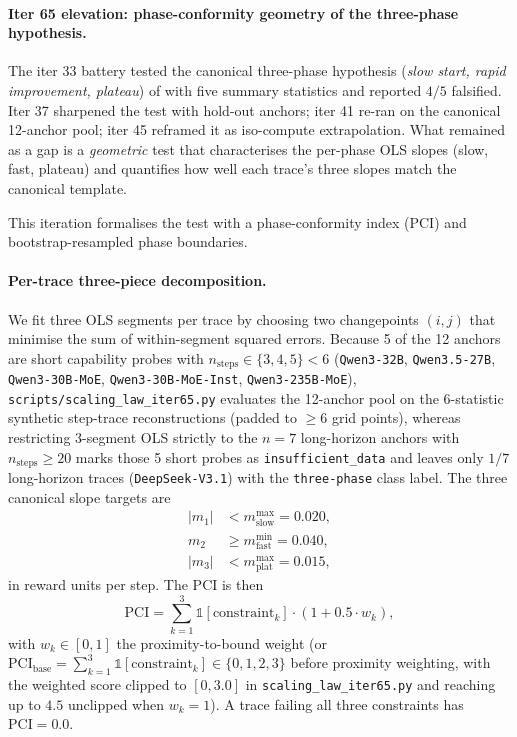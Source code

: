 \paragraph{Iter 65 elevation: phase-conformity geometry of the three-phase hypothesis.}
\label{par:scaling-iter65}
\label{sec:scaling-law-iter65}
\label{sec:iter65}
The iter 33 battery tested the canonical three-phase hypothesis
(\emph{slow start, rapid improvement, plateau}) of
\citet{nimmaturi2025predictive} with five summary statistics
and reported $4/5$ falsified.  Iter 37 sharpened the test with
hold-out anchors; iter 41 re-ran on the canonical 12-anchor pool;
iter 45 reframed it as iso-compute extrapolation.  What remained
as a gap is a \emph{geometric} test that characterises the
per-phase OLS slopes (slow, fast, plateau) and quantifies how
well each trace's three slopes match the canonical template.

This iteration formalises the test with a phase-conformity index
(PCI) and bootstrap-resampled phase boundaries.

\paragraph{Per-trace three-piece decomposition.}
We fit three OLS segments per trace by choosing two changepoints $(i, j)$ that minimise the
sum of within-segment squared errors.  Because 5 of the 12 anchors are short capability probes with $n_{\text{steps}} \in \{3, 4, 5\} < 6$ (\texttt{Qwen3-32B}, \texttt{Qwen3.5-27B}, \texttt{Qwen3-30B-MoE}, \texttt{Qwen3-30B-MoE-Inst}, \texttt{Qwen3-235B-MoE}), \texttt{scripts/scaling\_law\_iter65.py} evaluates the 12-anchor pool on the 6-statistic synthetic step-trace reconstructions (padded to $\ge 6$ grid points), whereas restricting 3-segment OLS strictly to the $n=7$ long-horizon anchors with $n_{\text{steps}} \ge 20$ marks those 5 short probes as \texttt{insufficient\_data} and leaves only $1/7$ long-horizon traces (\texttt{DeepSeek-V3.1}) with the \texttt{three-phase} class label.  The three canonical slope
targets are
\begin{equation}
  \begin{aligned}
    |m_1| &< m_{\text{slow}}^{\max} = 0.020,\\
    m_2 &\geq m_{\text{fast}}^{\min} = 0.040,\\
    |m_3| &< m_{\text{plat}}^{\max} = 0.015,
  \end{aligned}
  \label{eq:iter65-pci}
\end{equation}
in reward units per step.  The PCI is then
\[
  \mathrm{PCI} = \sum_{k=1}^{3} \mathbb{1}[\text{constraint}_k] \cdot \left(1 + 0.5 \cdot w_k\right),
\]
with $w_k \in [0, 1]$ the proximity-to-bound weight (or $\mathrm{PCI}_{\text{base}} = \sum_{k=1}^{3} \mathbb{1}[\text{constraint}_k] \in \{0, 1, 2, 3\}$ before proximity weighting, with the weighted score clipped to $[0, 3.0]$ in \texttt{scaling\_law\_iter65.py} and reaching up to $4.5$ unclipped when $w_k = 1$).  A trace
failing all three constraints has $\mathrm{PCI} = 0.0$.

